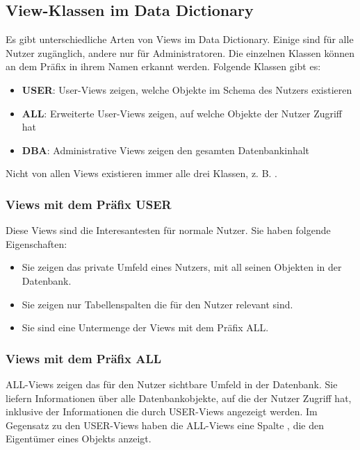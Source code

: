       \subsection{View-Klassen im Data Dictionary}
        Es gibt unterschiedliche Arten von Views im Data Dictionary. Einige sind für alle Nutzer zugänglich, andere nur für Administratoren. Die einzelnen Klassen können an dem Präfix in ihrem Namen erkannt werden. Folgende Klassen gibt es:
        \begin{itemize}
          \item \textbf{USER}: User-Views zeigen, welche Objekte im Schema des Nutzers existieren
          \item \textbf{ALL}: Erweiterte User-Views zeigen, auf welche Objekte der Nutzer Zugriff hat
          \item \textbf{DBA}: Administrative Views zeigen den gesamten Datenbankinhalt
        \end{itemize}
   
        \begin{merke}
          Nicht von allen Views existieren immer alle drei Klassen, z. B. .
        \end{merke}
        \subsubsection{Views mit dem Präfix USER}
          Diese Views sind die Interesantesten für normale Nutzer. Sie haben folgende Eigenschaften:
          \begin{itemize}
            \item Sie zeigen das private Umfeld eines Nutzers, mit all seinen Objekten in der Datenbank.
            \item Sie zeigen nur Tabellenspalten die für den Nutzer relevant sind.
            \item Sie sind eine Untermenge der Views mit dem Präfix ALL.
					\end{itemize}
\clearpage
					\subsubsection{Views mit dem Präfix ALL}
          ALL-Views zeigen das für den Nutzer sichtbare Umfeld in der Datenbank. Sie liefern Informationen über alle Datenbankobjekte, auf die der Nutzer Zugriff hat, inklusive der Informationen die durch USER-Views angezeigt werden. Im Gegensatz zu den USER-Views haben die ALL-Views eine Spalte , die den Eigentümer eines Objekts anzeigt.
